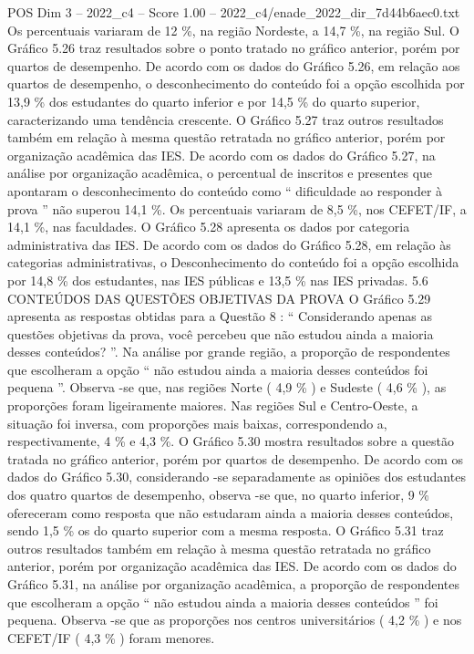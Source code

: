 \begin{textsample}{POS Dim 3 – 2022\_c4 – Score 1.00 – 2022\_c4/enade\_2022\_dir\_7d44b6aec0.txt}
Os percentuais variaram de 12 \%, na região Nordeste, a 14,7 \%, na região Sul.
O Gráfico 5.26 traz resultados sobre o ponto tratado no gráfico anterior, porém por quartos de desempenho.
De acordo com os dados do Gráfico 5.26, em relação aos quartos de desempenho, o desconhecimento do conteúdo foi a opção escolhida por 13,9 \% dos estudantes do quarto inferior e por 14,5 \% do quarto superior, caracterizando uma tendência crescente.
O Gráfico 5.27 traz outros resultados também em relação à mesma questão retratada no gráfico anterior, porém por organização acadêmica das IES.
De acordo com os dados do Gráfico 5.27, na análise por organização acadêmica, o percentual de inscritos e presentes que apontaram o desconhecimento do conteúdo como “ dificuldade ao responder à prova ” não superou 14,1 \%.
Os percentuais variaram de 8,5 \%, nos CEFET/IF, a 14,1 \%, nas faculdades.
O Gráfico 5.28 apresenta os dados por categoria administrativa das IES.
De acordo com os dados do Gráfico 5.28, em relação às categorias administrativas, o Desconhecimento do conteúdo foi a opção escolhida por 14,8 \% dos estudantes, nas IES públicas e 13,5 \% nas IES privadas. 5.6 CONTEÚDOS DAS QUESTÕES OBJETIVAS DA PROVA O Gráfico 5.29 apresenta as respostas obtidas para a Questão 8 : “ Considerando apenas as questões objetivas da prova, você percebeu que não estudou ainda a maioria desses conteúdos? ”.
Na análise por grande região, a proporção de respondentes que escolheram a opção “ não estudou ainda a maioria desses conteúdos foi pequena ”.
Observa -se que, nas regiões Norte ( 4,9 \% ) e Sudeste ( 4,6 \% ), as proporções foram ligeiramente maiores.
Nas regiões Sul e Centro-Oeste, a situação foi inversa, com proporções mais baixas, correspondendo a, respectivamente, 4 \% e 4,3 \%.
O Gráfico 5.30 mostra resultados sobre a questão tratada no gráfico anterior, porém por quartos de desempenho.
De acordo com os dados do Gráfico 5.30, considerando -se separadamente as opiniões dos estudantes dos quatro quartos de desempenho, observa -se que, no quarto inferior, 9 \% ofereceram como resposta que não estudaram ainda a maioria desses conteúdos, sendo 1,5 \% os do quarto superior com a mesma resposta.
O Gráfico 5.31 traz outros resultados também em relação à mesma questão retratada no gráfico anterior, porém por organização acadêmica das IES.
De acordo com os dados do Gráfico 5.31, na análise por organização acadêmica, a proporção de respondentes que escolheram a opção “ não estudou ainda a maioria desses conteúdos ” foi pequena.
Observa -se que as proporções nos centros universitários ( 4,2 \% ) e nos CEFET/IF ( 4,3 \% ) foram menores.

\end{textsample}

